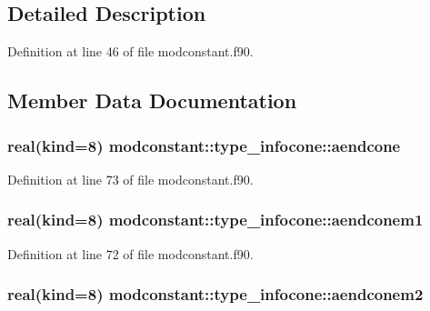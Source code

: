 \subsection{Detailed Description}


Definition at line 46 of file modconstant.\-f90.



\subsection{Member Data Documentation}
\hypertarget{structmodconstant_1_1type__infocone_a1bab9647b1a025184bc12a622c32ee89}{
\subsubsection[{aendcone}]{\setlength{\rightskip}{0pt plus 5cm}real(kind=8) modconstant\-::type\-\_\-infocone\-::aendcone}}\label{structmodconstant_1_1type__infocone_a1bab9647b1a025184bc12a622c32ee89}


Definition at line 73 of file modconstant.\-f90.

\hypertarget{structmodconstant_1_1type__infocone_ab4b650709fd01e57e6cd61649cd9eae1}{
\subsubsection[{aendconem1}]{\setlength{\rightskip}{0pt plus 5cm}real(kind=8) modconstant\-::type\-\_\-infocone\-::aendconem1}}\label{structmodconstant_1_1type__infocone_ab4b650709fd01e57e6cd61649cd9eae1}


Definition at line 72 of file modconstant.\-f90.

\hypertarget{structmodconstant_1_1type__infocone_a9355c55f454969fca79d594a315244c1}{
\subsubsection[{aendconem2}]{\setlength{\rightskip}{0pt plus 5cm}real(kind=8) modconstant\-::type\-\_\-infocone\-::aendconem2}}\label{structmodconstant_1_1type__infocone_a9355c55f454969fca79d594a315244c1}


